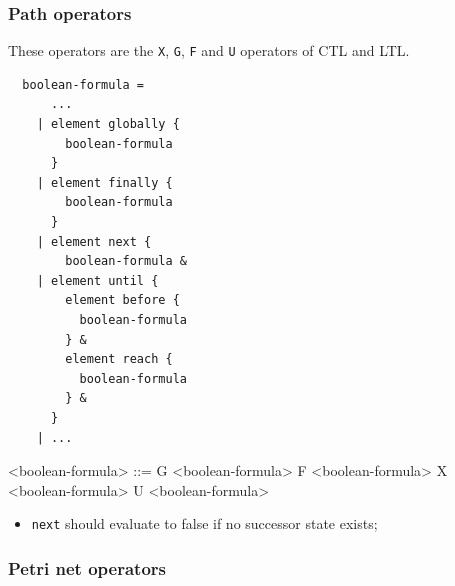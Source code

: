 \documentclass[10pt,english,a4paper]{article}
\begin{document}
\subsubsection{Path operators}

These operators are the \lstinline!X!, \lstinline!G!, \lstinline!F! and \lstinline!U!
operators of CTL and LTL.


\begin{multicols}{2}
\begin{lstlisting}
  boolean-formula =
      ...
    | element globally {
        boolean-formula
      }
    | element finally {
        boolean-formula
      }
    | element next {
        boolean-formula &
    | element until {
        element before {
          boolean-formula
        } &
        element reach {
          boolean-formula
        } &
      }
    | ...
\end{lstlisting}
\columnbreak
\begin{grammar}
<boolean-formula> ::= G <boolean-formula>
\alt F <boolean-formula>
\alt X <boolean-formula>
 U <boolean-formula>
\end{grammar}
\end{multicols}


\begin{itemize}
  \item \lstinline!next! should evaluate to false if no successor state exists;
\end{itemize}

\subsubsection{Petri net operators}
\end{document}
